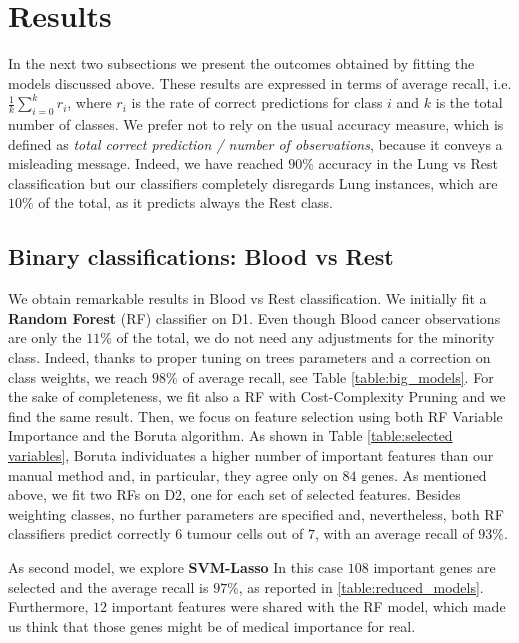 \documentclass[a4paper,11pt, oneside]{article}  %
\begin{document}
\section{Results}
In the next two subsections we present the outcomes obtained by fitting the models discussed above. These results are expressed in terms of average recall,  i.e.  
$\frac{1}{k} \sum\limits_{i = 0 }^k r_i$,
where $r_i$ is the rate of correct predictions for class $i$ and $k$ is the total number of classes. We prefer not to rely on the usual accuracy measure,  which is defined as \textit{total correct prediction / number of observations}, because it conveys a misleading message.  Indeed,  we have reached $90\%$ accuracy in the Lung vs Rest classification but our classifiers completely disregards Lung instances, which are $10\%$ of the total,   as it predicts always the Rest class.  

\subsection{Binary classifications: Blood vs Rest}
We obtain remarkable results in Blood vs Rest classification.  We initially fit a \textbf{Random Forest} (RF) classifier on D1.  Even though Blood cancer observations are only the $11\%$ of the total,  we do not need any adjustments for the minority class.  Indeed,  thanks to proper tuning on trees parameters and a correction on class weights, we reach $98\%$ of average recall,  see Table \ref{table:big_models}. For the sake of completeness,  we fit also a RF with Cost-Complexity Pruning and we find the same result. Then,  we focus on feature selection using both RF Variable Importance and the Boruta algorithm.  As shown in Table \ref{table:selected variables},  Boruta individuates a higher number of important features than our manual method and,  in particular,  they agree only on $84$ genes.  As mentioned above,  we fit two RFs on D2,  one for each set of selected features.  Besides weighting classes, no further parameters are specified and,  nevertheless,  both RF classifiers predict correctly $6$ tumour cells out of $7$,  with an average recall of $93\%$.

As second model,  we explore \textbf{SVM-Lasso} In this case $108$ important genes are selected  and the average recall is $97\%$, as reported in \ref{table:reduced_models}.  Furthermore,  $12$ important features were shared with the RF model,  which made us think that those genes might be of medical importance for real.\\
\end{document}
